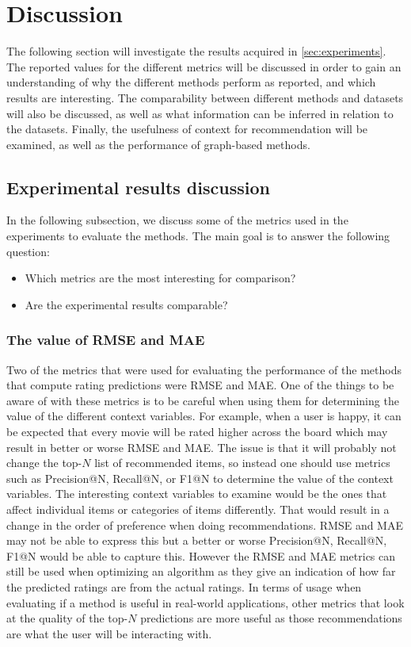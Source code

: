 \section{Discussion}\label{sec:discussion}
The following section will investigate the results acquired in \autoref{sec:experiments}.
The reported values for the different metrics will be discussed in order to gain an understanding of why the different methods perform as reported, and which results are interesting.
The comparability between different methods and datasets will also be discussed, as well as what information can be inferred in relation to the datasets.
Finally, the usefulness of context for recommendation will be examined, as well as the performance of graph-based methods.

\subsection{Experimental results discussion}
In the following subsection, we discuss some of the metrics used in the experiments to evaluate the methods.
The main goal is to answer the following question:
\begin{itemize}
    \item Which metrics are the most interesting for comparison?
    \item Are the experimental results comparable?
\end{itemize}

\subsubsection{The value of RMSE and MAE}
Two of the metrics that were used for evaluating the performance of the methods that compute rating predictions were RMSE and MAE.
One of the things to be aware of with these metrics is to be careful when using them for determining the value of the different context variables.
For example, when a user is happy, it can be expected that every movie will be rated higher across the board which may result in better or worse RMSE and MAE.
The issue is that it will probably not change the top-$N$ list of recommended items, so instead one should use metrics such as Precision@N, Recall@N, or F1@N to determine the value of the context variables.
The interesting context variables to examine would be the ones that affect individual items or categories of items differently.
That would result in a change in the order of preference when doing recommendations.
RMSE and MAE may not be able to express this but a better or worse Precision@N, Recall@N, F1@N would be able to capture this.
However the RMSE and MAE metrics can still be used when optimizing an algorithm as they give an indication of how far the predicted ratings are from the actual ratings.
In terms of usage when evaluating if a method is useful in real-world applications, other metrics that look at the quality of the top-$N$ predictions are more useful as those recommendations are what the user will be interacting with.

